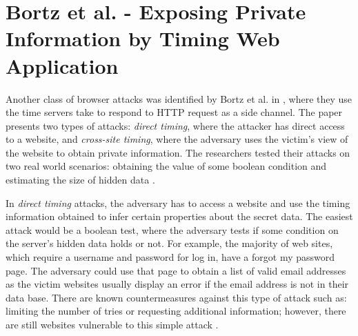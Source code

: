 \documentclass[10pt,a4paper,twoside]{book}
\begin{document}

\section{Bortz et al. - Exposing Private Information by Timing Web Application}
\label{bortz}

Another class of browser attacks was identified by Bortz et al. in \cite{bortz2007exposing}, where they use the time servers take to respond to HTTP request as a side channel. The paper presents two types of attacks: \textit{direct timing}, where the attacker has direct access to a website, and \textit{cross-site timing}, where the adversary uses the victim's view of the website to obtain private information. The researchers tested their attacks on two real world scenarios: obtaining the value of some boolean condition and estimating the size of hidden data \cite{bortz2007exposing}.

In \textit{direct timing} attacks, the adversary has to access a website and use the timing information obtained to infer certain properties about the secret data. The easiest attack would be a boolean test, where the adversary tests if some condition on the server's hidden data holds or not. For example, the majority of web sites, which require a username and password for log in, have a forgot my password page. The adversary could use that page to obtain a list of valid email addresses as the victim websites usually display an error if the email address is not in their data base. There are known countermeasures against this type of attack such as: limiting the number of tries or requesting additional information; however, there are still websites vulnerable to this simple attack \cite{bortz2007exposing}. 
\end{document}
